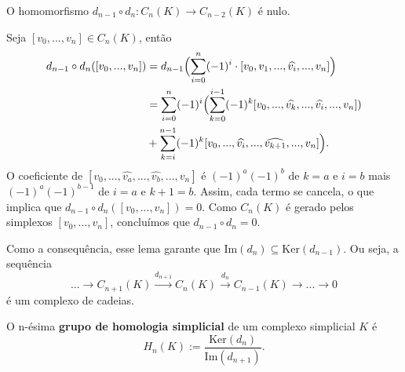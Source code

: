 \begin{lemma}
    O homomorfismo $d_{n-1}\circ d_n:C_n(K)\rightarrow C_{n-2}(K)$ é nulo.
\end{lemma}

\begin{dem}
    Seja $[v_0,...,v_n]\in C_n(K)$, então 
    \begin{align*}
        d_{n-1}\circ d_n ( [v_0,...,v_n])&=d_{n-1}\Bigl(\sum_{i=0}^n (-1)^i \cdot[v_0,v_1,...,\widehat{v_i},...,v_n] \Bigr) \\
        &=\sum_{i=0}^n (-1)^i  \Bigl( \sum_{k=0}^{i-1}(-1)^k[v_0,...,\widehat{v_k},...,\widehat{v_i},...,v_n])\\
        &+\sum_{k=i}^{n-1} (-1)^k[v_0,...,\widehat{v_i},...,\widehat{v_{k+1}},...,v_n]  \Bigr).
    \end{align*}
    O coeficiente de $[v_0,...,\widehat{v_a},...,\widehat{v_b},...,v_n]$ é $(-1)^a(-1)^b$ de $k=a$ e $i=b$ mais $(-1)^a(-1)^{b-1}$ de $i=a$ e $k+1=b$. Assim, cada termo se cancela, o que implica que $d_{n-1}\circ d_n([v_0,...,v_n])=0$. Como $C_n(K)$ é gerado pelos simplexos $[v_0,...,v_n]$, concluímos que $d_{n-1}\circ d_n=0$.
\end{dem}

Como a consequência, esse lema garante que $\text{Im}(d_n)\subseteq \text{Ker}(d_{n-1})$. Ou seja, a sequência 
\[...\rightarrow C_{n+1}(K)\xrightarrow{d_{n+1}}C_n(K)\xrightarrow{d_n} C_{n-1}(K)\rightarrow...\rightarrow 0\]
é um complexo de cadeias.

\begin{defi}
    O n-ésima \textbf{grupo de homologia simplicial} de um complexo simplicial $K$ é 
    \[H_n(K):=\frac{\text{Ker}(d_n)}{\text{Im}(d_{n+1})}.\]
\end{defi}




